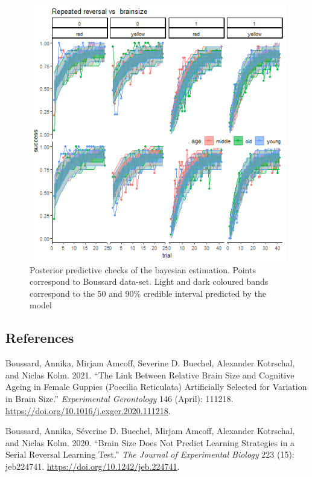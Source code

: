 \documentclass[
]{article}
\newlength{\cslhangindent}
\newlength{\cslentryspacingunit} %
\newenvironment{CSLReferences}[2] %
 {%
  \setlength{\parindent}{0pt}
  \ifodd #1
  \let\oldpar\par
  \def\par{\hangindent=\cslhangindent\oldpar}
  \fi
  \setlength{\parskip}{#2\cslentryspacingunit}
 }%
 {}
\begin{document}
\begin{figure}

\includegraphics[width=6.67in,]{images/boussard2_ppchecks_colour} \hfill{}

\caption{Posterior predictive checks of the bayesian estimation. Points correspond to Boussard data-set. Light and dark coloured bands correspond to the 50 and 90\% credible interval predicted by the model}\label{fig:unnamed-chunk-12}
\end{figure}

\hypertarget{references}{%
\subsection*{References}\label{references}}

\hypertarget{refs}{}
\begin{CSLReferences}{1}{0}
\leavevmode{}%
Boussard, Annika, Mirjam Amcoff, Severine D. Buechel, Alexander
Kotrschal, and Niclas Kolm. 2021. {``The Link Between Relative Brain
Size and Cognitive Ageing in Female Guppies ({Poecilia} Reticulata)
Artificially Selected for Variation in Brain Size.''} \emph{Experimental
Gerontology} 146 (April): 111218.
\url{https://doi.org/10.1016/j.exger.2020.111218}.

\leavevmode{}%
Boussard, Annika, Séverine D. Buechel, Mirjam Amcoff, Alexander
Kotrschal, and Niclas Kolm. 2020. {``Brain Size Does Not Predict
Learning Strategies in a Serial Reversal Learning Test.''} \emph{The
Journal of Experimental Biology} 223 (15): jeb224741.
\url{https://doi.org/10.1242/jeb.224741}.

\end{CSLReferences}
\end{document}
